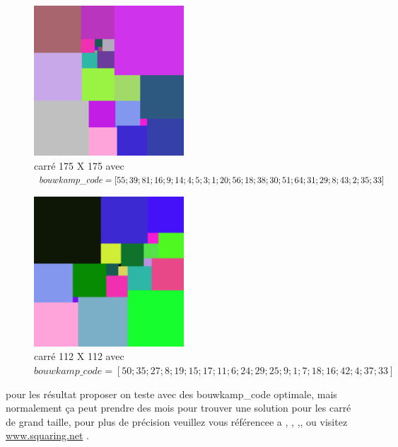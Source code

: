 \documentclass{article}
\begin{document}
\begin{figure}[htbp]
  \centering
  
  \includegraphics[width=0.5\textwidth]{image/175-175.png}
  \caption{carré 175 X 175 avec $bouwkamp\_code = [55;39;81;16;9;14;4;5;3;1;20;56;18;38;30;51;64;31;29;8;43\newline;2;35;33]$}
  \label{fig7}

\end{figure}


\begin{figure}[htbp]
  \centering
  
  \includegraphics[width=0.5\textwidth]{image/112-112.png}
  \caption{carré 112 X 112 avec $bouwkamp\_code = [50;35;27;8;19;15;17;11;6;24;29;25;9;1;7;18;16;42;4;37;33]$}
  \label{fig8}

\end{figure}


pour les résultat proposer on teste avec des bouwkamp\_code optimale, mais normalement ça peut prendre des mois pour trouver une solution pour les carré de grand taille, pour plus de précision veuillez vous référencee a \citet{Gambini1999}, \citet{bouwkamp_dissection} ,\citet{bouwkamp_catalogue_simple} ,\citet{bouwkamp_catalogue_perfect}, ou visitez \href{http://www.squaring.net/}{www.squaring.net} .
\newpage
\end{document}
